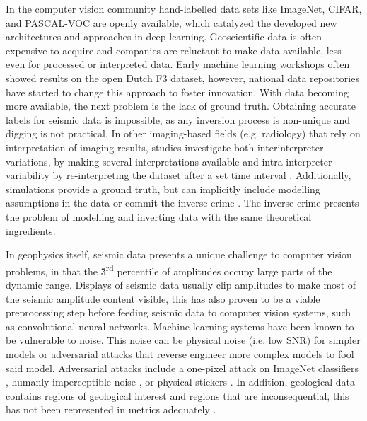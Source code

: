 In the computer vision community hand-labelled data sets like ImageNet, CIFAR, and PASCAL-VOC are openly available, which catalyzed the developed new architectures and approaches in deep learning. Geoscientific data is often expensive to acquire and companies are reluctant to make data available, less even for processed or interpreted data. Early machine learning workshops often showed results on the open Dutch F3 dataset, however, national data repositories have started to change this approach to foster innovation. With data becoming more available, the next problem is the lack of ground truth. Obtaining accurate labels for seismic data is impossible, as any inversion process is non-unique and digging is not practical. In other imaging-based fields (e.g. radiology) that rely on interpretation of imaging results, studies investigate both interinterpreter variations, by making several interpretations available and intra-interpreter variability by re-interpreting the dataset after a set time interval \citep{macerlean2013, alikhassi2018comparison,al2010inter}. Additionally, simulations provide a ground truth, but can implicitly include modelling assumptions in the data or commit the inverse crime \citep{wirgin2004inverse}. The inverse crime presents the problem of modelling and inverting data with the same theoretical ingredients.


In geophysics itself, seismic data presents a unique challenge to computer vision problems, in that the \~3\textsuperscript{rd} percentile of amplitudes occupy large parts of the dynamic range. Displays of seismic data usually clip amplitudes to make most of the seismic amplitude content visible, this has also proven to be a viable preprocessing step before feeding seismic data to computer vision systems, such as convolutional neural networks. Machine learning systems have been known to be vulnerable to noise. This noise can be physical noise (i.e. low SNR) for simpler models or adversarial attacks that reverse engineer more complex models to fool said model. Adversarial attacks include a one-pixel attack on ImageNet classifiers \citep{su2019one}, humanly imperceptible noise \citep{goodfellow2014explaining}, or physical stickers \citep{brown2017adversarial}. In addition, geological data contains regions of geological interest and regions that are inconsequential, this has not been represented in metrics adequately \citep{purves2019towards}.


